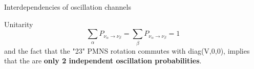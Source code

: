 %
%
%

\begin{frame}{Interdependencies of oscillation channels}

{\small
  Unitarity
  \begin{equation*}
  \displaystyle
    \sum_{\alpha} P_{\nu_{\alpha} \rightarrow \nu_{\beta}} =
    \sum_{\beta}  P_{\nu_{\alpha} \rightarrow \nu_{\beta}} = 1
  \end{equation*}
  and the fact that the "23" PMNS rotation commutes with
  diag(V,0,0), implies that the are
  {\bf only 2 independent oscillation probabilities}.\\
}

\begin{columns}[T]
 \begin{column}{0.56\textwidth}
   \begin{block}{}
\end{block}
\end{column}
\end{columns}
\end{frame}
